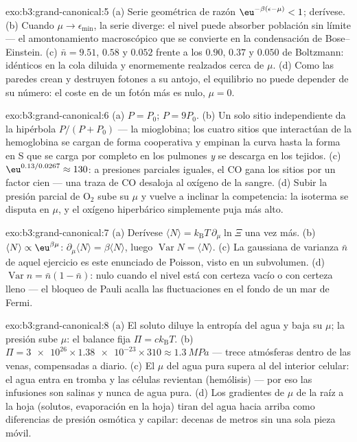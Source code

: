 \begin{solution}{exo:b3:grand-canonical:5}
(a) Serie geométrica de razón $\eu^{-\beta(\epsilon-\mu)} < 1$;
derívese. (b) Cuando $\mu \to \epsilon_{\min}$, la serie
diverge: el nivel puede absorber población sin límite --- el
amontonamiento macroscópico que se convierte en la condensación de
Bose--Einstein. (c) $\bar n = 9.51$, $0.58$ y $0.052$ frente a los
$0.90$, $0.37$ y $0.050$ de Boltzmann: idénticos en la cola diluida y
enormemente realzados cerca de $\mu$. (d) Como las paredes crean y destruyen
fotones a su antojo, el equilibrio no puede depender de su número: el coste
en  de un fotón más es nulo, $\mu = 0$.
\end{solution}

\begin{solution}{exo:b3:grand-canonical:6}
(a) $P = P_0$; $P = 9P_0$. (b) Un solo sitio independiente da la
hipérbola $P/(P + P_0)$ --- la mioglobina; los cuatro sitios que
interactúan de la hemoglobina se cargan de forma cooperativa y empinan la
curva hasta la forma en S que se carga por completo en los pulmones
\emph{y} se descarga en los tejidos. (c) $\eu^{0.13/0.0267} \approx 130$: a
presiones parciales iguales, el CO gana los sitios por un factor cien --- una
traza de CO desaloja al oxígeno de la sangre. (d) Subir la presión parcial
de O$_2$ sube su $\mu$ y vuelve a inclinar la competencia: la
isoterma se disputa en $\mu$, y el oxígeno hiperbárico simplemente
puja más alto.
\end{solution}

\begin{solution}{exo:b3:grand-canonical:7}
(a) Derívese $\langle N\rangle = k_{\text{B}}T\,\partial_\mu
\ln\Xi$ una vez más. (b) $\langle N\rangle \propto
\eu^{\beta\mu}$: $\partial_\mu\langle N\rangle = \beta\langle
N\rangle$, luego $\operatorname{Var}N = \langle N\rangle$. (c) La
gaussiana de varianza $\bar n$ de aquel ejercicio es este enunciado de
Poisson, visto en un subvolumen. (d) $\operatorname{Var}n =
\bar n(1 - \bar n)$: nulo cuando el nivel está con certeza vacío o con
certeza lleno --- el bloqueo de Pauli acalla las fluctuaciones en el fondo
de un mar de Fermi.
\end{solution}

\begin{solution}{exo:b3:grand-canonical:8}
(a) El soluto diluye la entropía del agua y baja su $\mu$; la presión
sube $\mu$: el balance fija $\Pi = ck_{\text{B}}T$. (b) $\Pi =
\num{3e26} \times \num{1.38e-23} \times 310 \approx
\qty{1.3}{MPa}$ --- trece atmósferas dentro de las venas,
compensadas a diario. (c) El $\mu$ del agua pura supera al del
interior celular: el agua entra en tromba y las células revientan
(hemólisis) --- por eso las infusiones son salinas y nunca de agua pura.
(d) Los gradientes de $\mu$ de la raíz a la hoja (solutos, evaporación en la
hoja) tiran del agua hacia arriba como diferencias de presión osmótica y
capilar: decenas de metros sin una sola pieza móvil.
\end{solution}

